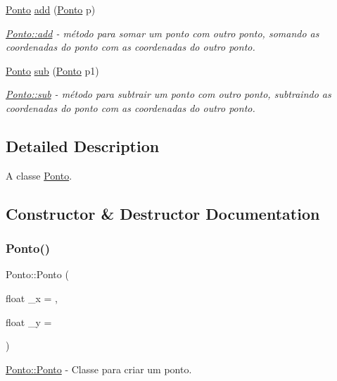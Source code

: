 \begin{DoxyCompactItemize}
\hyperlink{classPonto}{Ponto} \hyperlink{classPonto_af05e1eac2bd0c30fc4ec909b8500f762}{add} (\hyperlink{classPonto}{Ponto} p)
\begin{DoxyCompactList}\small\item\em \hyperlink{classPonto_af05e1eac2bd0c30fc4ec909b8500f762}{Ponto\+::add} -\/ método para \textquotesingle{}somar\textquotesingle{} um ponto com outro ponto, somando as coordenadas do ponto com as coordenadas do outro ponto. \end{DoxyCompactList}\item 
\hyperlink{classPonto}{Ponto} \hyperlink{classPonto_a8404fcad0fca2ce768ab9e1550f5d3a0}{sub} (\hyperlink{classPonto}{Ponto} p1)
\begin{DoxyCompactList}\small\item\em \hyperlink{classPonto_a8404fcad0fca2ce768ab9e1550f5d3a0}{Ponto\+::sub} -\/ método para \textquotesingle{}subtrair\textquotesingle{} um ponto com outro ponto, subtraindo as coordenadas do ponto com as coordenadas do outro ponto. \end{DoxyCompactList}\end{DoxyCompactItemize}


\subsection{Detailed Description}
A classe \hyperlink{classPonto}{Ponto}. 

\subsection{Constructor \& Destructor Documentation}
\mbox{\label{classPonto_a5a157b4f3dc28842de40f505666f8899}} 
\subsubsection{\texorpdfstring{Ponto()}{Ponto()}}
{\footnotesize\ttfamily Ponto\+::\+Ponto (\begin{DoxyParamCaption}\item[{float}]{\+\_\+x = {},  }\item[{float}]{\+\_\+y = {} }\end{DoxyParamCaption})}



\hyperlink{classPonto_a5a157b4f3dc28842de40f505666f8899}{Ponto\+::\+Ponto} -\/ Classe para criar um ponto. 


